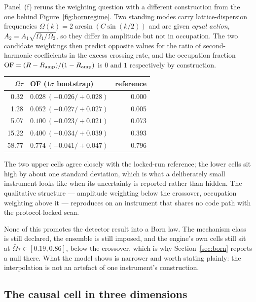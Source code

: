 \documentclass[11pt,a4paper]{article}
\theoremstyle{definition}
\theoremstyle{plain}
\theoremstyle{remark}
\begin{document}
Panel~(f) reruns the weighting question with a different construction from
the one behind Figure~\ref{fig:bornregime}. Two standing modes carry
lattice-dispersion frequencies $\Omega(k) = 2\arcsin(C\sin(k/2))$ and are
given \emph{equal action}, $A_{2} = A_{1}\sqrt{\Omega_{1}/\Omega_{2}}$, so
they differ in amplitude but not in occupation. The two candidate
weightings then predict opposite values for the ratio of second-harmonic
coefficients in the excess crossing rate, and the occupation fraction
$\mathrm{OF} = (R - R_{\rm amp})/(1 - R_{\rm amp})$ is $0$ and $1$
respectively by construction.

\begin{center}
\small
\begin{tabular}{@{}rlr@{}}
\toprule
$\bar\Omega\tau$ & OF ($1\sigma$ bootstrap) & reference \\
\midrule
0.32  & $0.028\ (-0.026/{+}0.028)$ & 0.000 \\
1.28  & $0.052\ (-0.027/{+}0.027)$ & 0.005 \\
5.07  & $0.100\ (-0.023/{+}0.021)$ & 0.073 \\
15.22 & $0.400\ (-0.034/{+}0.039)$ & 0.393 \\
58.77 & $0.774\ (-0.041/{+}0.047)$ & 0.796 \\
\bottomrule
\end{tabular}
\end{center}

\noindent The two upper cells agree closely with the locked-run reference;
the lower cells sit high by about one standard deviation, which is what a
deliberately small instrument looks like when its uncertainty is reported
rather than hidden. The qualitative structure --- amplitude weighting
below the crossover, occupation weighting above it --- reproduces on an
instrument that shares no code path with the protocol-locked scan.

None of this promotes the detector result into a Born law. The mechanism
class is still declared, the ensemble is still imposed, and the engine's
own cells still sit at $\bar\Omega\tau \in [0.19, 0.86]$, below the
crossover, which is why Section~\ref{sec:born} reports a null there. What
the model shows is narrower and worth stating plainly: the interpolation
is not an artefact of one instrument's construction.

\subsection{The causal cell in three dimensions}
\label{sec:cell3d}
\end{document}
